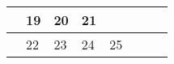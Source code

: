{\begin{tabularx}{\linewidth}{|l!{\vrule width \myLenLineThicknessThick}*{7}{@{}X@{}|}}
       & 
    
      
      
        \begin{minipage}[t]{6mm}\centering{}19\end{minipage}
      
       & 
    
      
      
        \begin{minipage}[t]{6mm}\centering{}20\end{minipage}
      
       & 
    
      
      
        \begin{minipage}[t]{6mm}\centering{}21\end{minipage}
      
      
        \\  \hline 
      
    
  
  
  
  \hyperlink{week-2026-25}{} &
    
      
      
        \begin{minipage}[t]{6mm}\centering{}22\end{minipage}
      
       & 
    
      
      
        \begin{minipage}[t]{6mm}\centering{}23\end{minipage}
      
       & 
    
      
      
        \begin{minipage}[t]{6mm}\centering{}24\end{minipage}
      
       & 
    
      
      
        \begin{minipage}[t]{6mm}\centering{}25\end{minipage}
      
       & 
    
      
      

\end{tabularx}}
